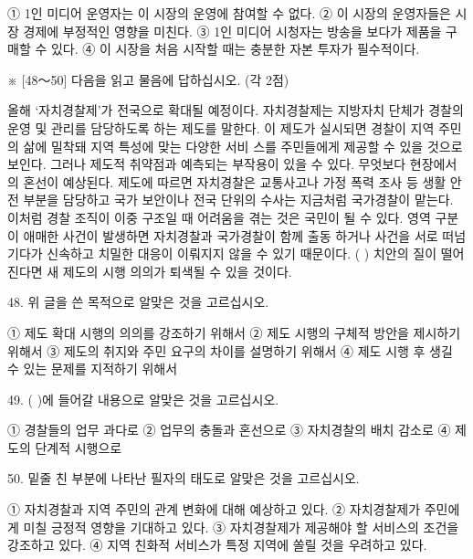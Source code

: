 \documentclass[12pt]{article}
\begin{document}
\begin{enumerate}[1.]
① 1인 미디어 운영자는 이 시장의 운영에 참여할 수 없다.
② 이 시장의 운영자들은 시장 경제에 부정적인 영향을 미친다.
③ 1인 미디어 시청자는 방송을 보다가 제품을 구매할 수 있다.
④ 이 시장을 처음 시작할 때는 충분한 자본 투자가 필수적이다.




※ [48～50] 다음을 읽고 물음에 답하십시오. (각 2점)

  올해 ‘자치경찰제’가 전국으로 확대될 예정이다. 자치경찰제는 지방자치
단체가 경찰의 운영 및 관리를 담당하도록 하는 제도를 말한다. 이 제도가
실시되면 경찰이 지역 주민의 삶에 밀착돼 지역 특성에 맞는 다양한 서비
스를 주민들에게 제공할 수 있을 것으로 보인다. 그러나 제도적 취약점과
예측되는 부작용이 있을 수 있다. 무엇보다 현장에서의 혼선이 예상된다.
제도에 따르면 자치경찰은 교통사고나 가정 폭력 조사 등 생활 안전 부분을
담당하고 국가 보안이나 전국 단위의 수사는 지금처럼 국가경찰이 맡는다.
이처럼 경찰 조직이 이중 구조일 때 어려움을 겪는 것은 국민이 될 수 있다.
영역 구분이 애매한 사건이 발생하면 자치경찰과 국가경찰이 함께 출동
하거나 사건을 서로 떠넘기다가 신속하고 치밀한 대응이 이뤄지지 않을
수 있기 때문이다. (      ) 치안의 질이 떨어진다면 새 제도의
시행 의의가 퇴색될 수 있을 것이다.


48. 위 글을 쓴 목적으로 알맞은 것을 고르십시오.

① 제도 확대 시행의 의의를 강조하기 위해서
② 제도 시행의 구체적 방안을 제시하기 위해서
③ 제도의 취지와 주민 요구의 차이를 설명하기 위해서
④ 제도 시행 후 생길 수 있는 문제를 지적하기 위해서


49. (    )에 들어갈 내용으로 알맞은 것을 고르십시오.

① 경찰들의 업무 과다로	② 업무의 충돌과 혼선으로
③ 자치경찰의 배치 감소로	④ 제도의 단계적 시행으로


50. 밑줄 친 부분에 나타난 필자의 태도로 알맞은 것을 고르십시오.

① 자치경찰과 지역 주민의 관계 변화에 대해 예상하고 있다.
② 자치경찰제가 주민에게 미칠 긍정적 영향을 기대하고 있다.
③ 자치경찰제가 제공해야 할 서비스의 조건을 강조하고 있다.
④ 지역 친화적 서비스가 특정 지역에 쏠릴 것을 우려하고 있다.
    \end{enumerate}
\end{document}
